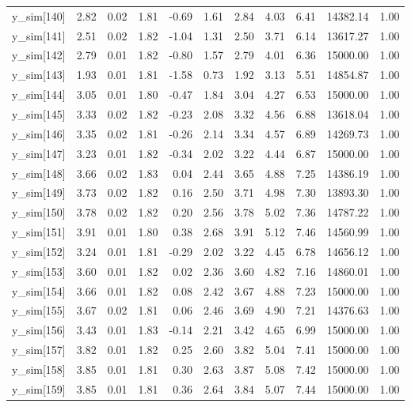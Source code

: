 \begin{table}[ht]
\begin{tabular}{rrrrrrrrrrr}
  y\_sim[140] & 2.82 & 0.02 & 1.81 & -0.69 & 1.61 & 2.84 & 4.03 & 6.41 & 14382.14 & 1.00 \\ 
  y\_sim[141] & 2.51 & 0.02 & 1.82 & -1.04 & 1.31 & 2.50 & 3.71 & 6.14 & 13617.27 & 1.00 \\ 
  y\_sim[142] & 2.79 & 0.01 & 1.82 & -0.80 & 1.57 & 2.79 & 4.01 & 6.36 & 15000.00 & 1.00 \\ 
  y\_sim[143] & 1.93 & 0.01 & 1.81 & -1.58 & 0.73 & 1.92 & 3.13 & 5.51 & 14854.87 & 1.00 \\ 
  y\_sim[144] & 3.05 & 0.01 & 1.80 & -0.47 & 1.84 & 3.04 & 4.27 & 6.53 & 15000.00 & 1.00 \\ 
  y\_sim[145] & 3.33 & 0.02 & 1.82 & -0.23 & 2.08 & 3.32 & 4.56 & 6.88 & 13618.04 & 1.00 \\ 
  y\_sim[146] & 3.35 & 0.02 & 1.81 & -0.26 & 2.14 & 3.34 & 4.57 & 6.89 & 14269.73 & 1.00 \\ 
  y\_sim[147] & 3.23 & 0.01 & 1.82 & -0.34 & 2.02 & 3.22 & 4.44 & 6.87 & 15000.00 & 1.00 \\ 
  y\_sim[148] & 3.66 & 0.02 & 1.83 & 0.04 & 2.44 & 3.65 & 4.88 & 7.25 & 14386.19 & 1.00 \\ 
  y\_sim[149] & 3.73 & 0.02 & 1.82 & 0.16 & 2.50 & 3.71 & 4.98 & 7.30 & 13893.30 & 1.00 \\ 
  y\_sim[150] & 3.78 & 0.02 & 1.82 & 0.20 & 2.56 & 3.78 & 5.02 & 7.36 & 14787.22 & 1.00 \\ 
  y\_sim[151] & 3.91 & 0.01 & 1.80 & 0.38 & 2.68 & 3.91 & 5.12 & 7.46 & 14560.99 & 1.00 \\ 
  y\_sim[152] & 3.24 & 0.01 & 1.81 & -0.29 & 2.02 & 3.22 & 4.45 & 6.78 & 14656.12 & 1.00 \\ 
  y\_sim[153] & 3.60 & 0.01 & 1.82 & 0.02 & 2.36 & 3.60 & 4.82 & 7.16 & 14860.01 & 1.00 \\ 
  y\_sim[154] & 3.66 & 0.01 & 1.82 & 0.08 & 2.42 & 3.67 & 4.88 & 7.23 & 15000.00 & 1.00 \\ 
  y\_sim[155] & 3.67 & 0.02 & 1.81 & 0.06 & 2.46 & 3.69 & 4.90 & 7.21 & 14376.63 & 1.00 \\ 
  y\_sim[156] & 3.43 & 0.01 & 1.83 & -0.14 & 2.21 & 3.42 & 4.65 & 6.99 & 15000.00 & 1.00 \\ 
  y\_sim[157] & 3.82 & 0.01 & 1.82 & 0.25 & 2.60 & 3.82 & 5.04 & 7.41 & 15000.00 & 1.00 \\ 
  y\_sim[158] & 3.85 & 0.01 & 1.81 & 0.30 & 2.63 & 3.87 & 5.08 & 7.42 & 15000.00 & 1.00 \\ 
  y\_sim[159] & 3.85 & 0.01 & 1.81 & 0.36 & 2.64 & 3.84 & 5.07 & 7.44 & 15000.00 & 1.00 \\ 

\end{tabular}
\end{table}
